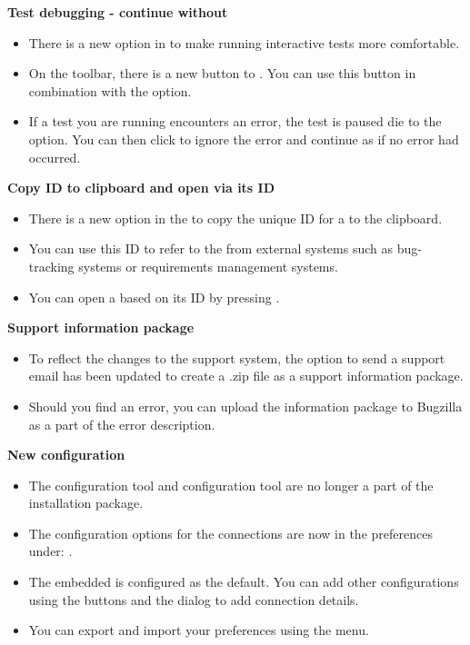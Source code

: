 \textbf{Test debugging - continue without \gdehandler{}}
\begin{itemize}
\item There is a new option in \app{} to make running interactive tests more comfortable. 
\item On the toolbar, there is a new button to . You can use this button in combination with the  option. 
\item If a test you are running encounters an error, the test is paused die to the  option. You can then click  to ignore the error and continue as if no error had occurred. 
\end{itemize}

\textbf{Copy ID to clipboard and open \gdcase{} via its ID}
\begin{itemize}
\item There is a new option in the \gdtestcasebrowser{} to copy the unique ID for a \gdcase{} to the clipboard.
\item You can use this ID to refer to the \gdcase{} from external systems such as bug-tracking systems or requirements management systems. 
\item You can open a \gdcase{} based on its ID by pressing .
\end{itemize}

\textbf{Support information package}
\begin{itemize}
\item To reflect the changes to the support system, the option to send a support email has been updated to create a .zip file as a support information package.
\item Should you find an error, you can upload the information package to Bugzilla as a part of the error description.
\end{itemize}

\textbf{New \gddb{} configuration}
\begin{itemize}
\item The configuration tool and \gddb{} configuration tool are no longer a part of the installation package. 
\item The configuration options for the \gddb{} connections are now in the preferences under: .
\item The embedded \gddb{} is configured as the default. You can add other \gddb{} configurations using the buttons and the dialog to add \gddb{} connection details.
\item You can export and import your \gddb{} preferences using the  menu.
\end{itemize}

